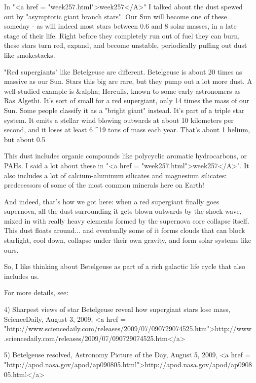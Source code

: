 In "<a href = "week257.html">week257</A>" I talked about the
dust spewed out by "asymptotic giant branch stars".  Our Sun
will become one of these someday - as will indeed most stars between
0.6 and 8 solar masses, in a late stage of their life.  Right before
they completely run out of fuel they can burn, these stars turn red,
expand, and become unstable, periodically puffing out dust like
smokestacks.

"Red supergiants" like Betelgeuse are different.
Betelgeuse is about 20 times as massive as our Sun.  Stars this big
are rare, but they pump out a lot more dust.  A well-studied example
is &alpha; Herculis, known to some early astronomers as Ras Algethi.
It's sort of small for a red supergiant, only 14 times the mass of our
Sun.  Some people classify it as a "bright giant" instead.
It's part of a triple star system.  It emits a stellar wind
blowing outwards at about 10 kilometers per second, and it loses at
least 6 ^{19} tons of mass each year.  That's about
1%
helium, but about 0.5%

This dust includes organic compounds like polycyclic aromatic
hydrocarbons, or PAHs.  I said a lot about these in "<a href =
"week257.html">week257</A>".  It also includes a lot of
calcium-aluminum silicates and magnesium silicates: predecessors of
some of the most common minerals here on Earth!  

And indeed, that's how we got here: when a red supergiant finally goes
supernova, all the dust surrounding it gets blown outwards by the
shock wave, mixed in with really heavy elements formed by the
supernova core collapse itself.  This dust floats around... and
eventually some of it forms clouds that can block starlight, cool
down, collapse under their own gravity, and form solar systems like
ours.

So, I like thinking about Betelgeuse as part of a rich galactic 
life cycle that also includes us.

For more details, see:

4) Sharpest views of star Betelgeuse reveal how supergiant stars lose
mass, ScienceDaily, August 3, 2009,
<a href = "http://www.sciencedaily.com/releases/2009/07/090729074525.htm">http://www.sciencedaily.com/releases/2009/07/090729074525.htm</a>

5) Betelgeuse resolved, Astronomy Picture of the Day, August 5, 2009,
<a href = "http://apod.nasa.gov/apod/ap090805.html">http://apod.nasa.gov/apod/ap090805.html</a>

